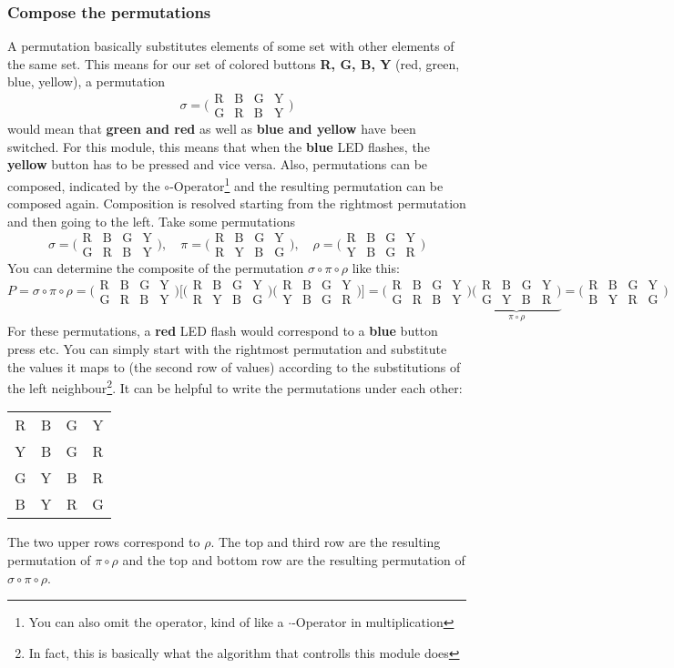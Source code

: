 \documentclass[a4paper]{article}
\newcommand{\perm}[4]{
	\bigl(\begin{smallmatrix}
		\mbox{R} & \mbox{B} & \mbox{G} & \mbox{Y} \\
		\mbox{#1}&\mbox{#2}&\mbox{#3}&\mbox{#4}
	\end{smallmatrix}\bigr)
}
\begin{document}
\subsubsection*{Compose the permutations}
A permutation basically substitutes elements of some set with other elements of the same set. This means for our set of colored buttons \textbf{R, G, B, Y} (red, green, blue, yellow), 
a permutation
\[
	\sigma = \perm{G}{R}{B}{Y}
\]
would mean that \textbf{green and red} as well as \textbf{blue and yellow} have been switched. For this module, this means that when the \textbf{blue} LED flashes, the \textbf{yellow}
button has to be pressed and vice versa. Also, permutations can be composed, indicated by the $\circ$-Operator\footnote{You can also omit the operator, kind of like a $\cdot$-Operator in multiplication} and the resulting permutation can be composed again. Composition is resolved starting from the rightmost permutation and then going to the left. Take some permutations
\[
	\sigma = \perm{G}{R}{B}{Y},\quad \pi = \perm{R}{Y}{B}{G}, \quad \rho  =\perm{Y}{B}{G}{R}
\]
You can determine the composite of the permutation $\sigma\circ\pi\circ\rho$ like this:
\[
	P=\sigma\circ\pi\circ\rho=\perm{G}{R}{B}{Y}\bigl[\perm{R}{Y}{B}{G}\perm{Y}{B}{G}{R}\bigr]=\perm{G}{R}{B}{Y}\underbrace{\perm{G}{Y}{B}{R}}_{\pi\circ\rho}=
		\perm{B}{Y}{R}{G}
\]
For these permutations, a \textbf{red} LED flash would correspond to a \textbf{blue} button press etc. You can simply start with the rightmost permutation and substitute the values it maps 
to (the second row of values) according to the substitutions of the left neighbour\footnote{In fact, this is basically what the algorithm that controlls this module does}. It can be helpful to write the permutations under each other:
\begin{table}[h]
\centering
\def\arraystretch{2}
 \begin{tabular}{cccc}
 R & B & G & Y \\
 Y & B & G & R \\
 G & Y & B & R \\
 B & Y & R & G
 \end{tabular}
 \end{table}

\noindent
The two upper rows correspond to $\rho$. The top and third row are the resulting permutation of $\pi\circ\rho$ and the top and bottom row are the resulting permutation of $\sigma\circ\pi\circ\rho$. 
\end{document}
